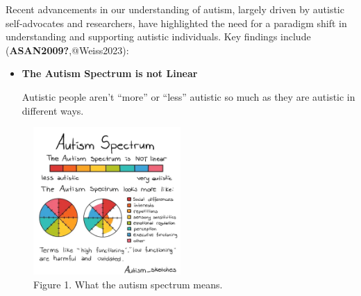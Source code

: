 \documentclass[
  letterpaper,
  DIV=11,
  numbers=noendperiod]{scrreprt}
\begin{document}
Recent advancements in our understanding of autism, largely driven by
autistic self-advocates and researchers, have highlighted the need for a
paradigm shift in understanding and supporting autistic individuals. Key
findings include (\textbf{ASAN2009?},@Weiss2023):

\begin{itemize}
\item
  \textbf{The Autism Spectrum is not Linear}

  Autistic people aren't ``more'' or ``less'' autistic so much as they
  are autistic in different ways.
\end{itemize}

\begin{figure}

{\centering \includegraphics[width=0.5\textwidth,height=\textheight]{./media/autism_spectrum.jpeg}

}

\caption{Figure 1. What the autism spectrum means.}

\end{figure}
\end{document}

